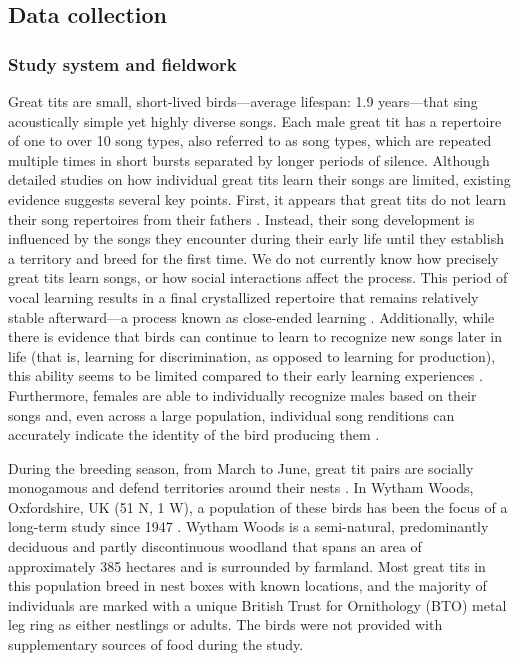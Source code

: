 \documentclass[9pt, onecolumn, twoside, lineno]{gsajnl}
\begin{document}
\subsection{Data collection}

\subsubsection{Study system and fieldwork}

Great tits are small, short-lived birds---average lifespan: 1.9 years---that sing acoustically simple yet highly diverse songs. Each male great tit has a repertoire of one to over 10 song types, also referred to as song types, which are repeated multiple times in short bursts separated by longer periods of silence. Although detailed studies on how individual great tits learn their songs are limited, existing evidence suggests several key points. First, it appears that great tits do not learn their song repertoires from their fathers \autocite{mcgregor1982b}. Instead, their song development is influenced by the songs they encounter during their early life until they establish a territory and breed for the first time. We do not currently know how precisely great tits learn songs, or how social interactions affect the process. This period of vocal learning results in a final crystallized repertoire that remains relatively stable afterward---a process known as close-ended learning \autocite{rivera-gutierrez2011}. Additionally, while there is evidence that birds can continue to learn to recognize new songs later in life (that is, learning for  discrimination, as opposed to learning for production), this ability seems to be limited compared to their early learning experiences \autocite{mcgregor1986}. Furthermore, females are able to individually recognize males based on their songs \autocite{lind1996} and, even across a large population, individual song renditions can accurately indicate the identity of the bird producing them \autocite{merinorecalde2023a}.

During the breeding season, from March to June, great tit pairs are socially monogamous and defend territories around their nests \autocite{hinde1952}. In Wytham Woods, Oxfordshire, UK (51 N, 1 W), a population of these birds has been the focus of a long-term study since 1947 \autocite{lack1964}. Wytham Woods is a semi-natural, predominantly deciduous and partly discontinuous woodland that spans an area of approximately 385 hectares and is surrounded by farmland. Most great tits in this population breed in nest boxes with known locations, and the majority of individuals are marked with a unique British Trust for Ornithology (BTO) metal leg ring as either nestlings or adults. The birds were not provided with supplementary sources of food during the study.
\end{document}
